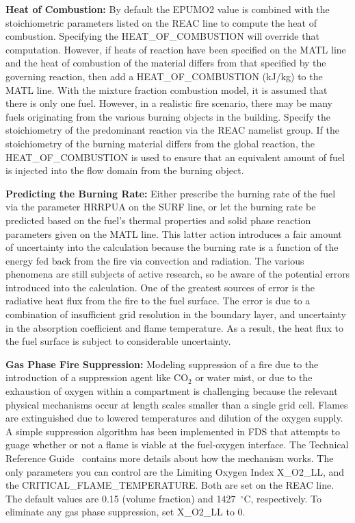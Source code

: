 \documentclass[11pt]{book}
\begin{document}
\vspace{\baselineskip}
\noindent
{\bf Heat of Combustion:} By default the {\ct EPUMO2} value is combined with
the stoichiometric parameters listed
on the {\ct REAC} line to compute the heat of combustion.  Specifying the
{\ct HEAT\_OF\_COMBUSTION} will override that computation.
However, if heats of reaction have been specified on the
{\ct MATL} line and
the heat of combustion of the material differs from that specified by
the governing reaction, then add a
{\ct HEAT\_OF\_COMBUSTION} (kJ/kg) to the {\ct MATL} line.
With the mixture fraction combustion
model, it is assumed that there is only one fuel. However, in a realistic
fire scenario, there may be many fuels originating from the various
burning objects in the building. Specify
the stoichiometry of the predominant reaction via the {\ct REAC}
namelist group. If the stoichiometry of the burning material
differs from the global reaction, the {\ct HEAT\_OF\_COMBUSTION} is
used to ensure that an equivalent amount of fuel is injected into the
flow domain from the burning object.

\vspace{\baselineskip}
\noindent
{\bf Predicting the Burning Rate:} Either
prescribe the burning rate of the fuel via the parameter {\ct HRRPUA}
on the {\ct SURF} line, or let the burning rate be
predicted based on the fuel's thermal properties and solid phase reaction parameters given on the
{\ct MATL} line. This latter action introduces a fair
amount of uncertainty into the calculation because the burning rate
is a function of the energy fed back from the fire via convection and
radiation.
The various phenomena are still subjects of active research, so
be aware of the potential errors introduced into the
calculation. One of the greatest sources of error is the radiative
heat flux from the fire to the fuel surface. The error is due to a
combination of insufficient grid resolution in the boundary layer, and
uncertainty in the absorption coefficient and flame temperature.
As a result, the heat flux to the fuel surface is subject to considerable uncertainty.


\vspace{\baselineskip}
\noindent
{\bf Gas Phase Fire Suppression:}
Modeling suppression of a fire due to the introduction of a suppression
agent like CO$_2$ or water mist, or due to the exhaustion of oxygen
within a compartment is challenging because
the relevant physical mechanisms occur at length scales smaller than a
single grid cell. Flames are extinguished due to lowered
temperatures and dilution of the oxygen supply. A simple
suppression algorithm has been implemented in FDS that attempts to
guage whether or not a flame is viable at the fuel-oxygen interface. The Technical Reference Guide~\cite{FDS_Tech_Guide_5}
contains more details about how the mechanism works. The only
parameters you can control are the Limiting
Oxygen Index {\ct X\_O2\_LL},
and the {\ct CRITICAL\_FLAME\_TEMPERATURE}. Both are
set on the {\ct REAC} line.
The default values are 0.15 (volume fraction) and 1427~$^\circ$C, respectively.
To eliminate any gas phase suppression, set {\ct X\_O2\_LL} to 0.
\end{document}

